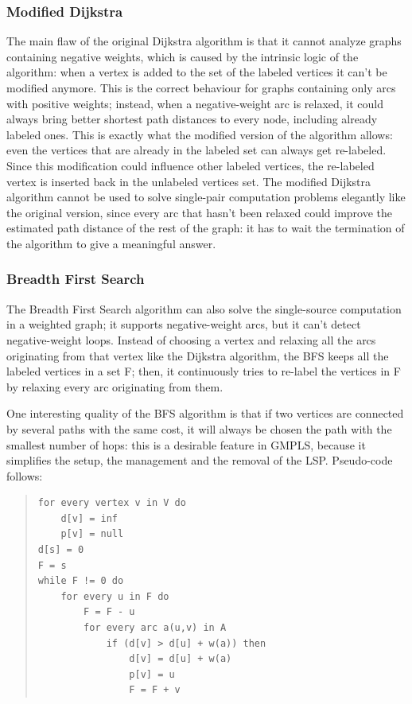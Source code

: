 \documentclass[10pt,a4paper]{report}
\begin{document}
\subsubsection{Modified Dijkstra}

The main flaw of the original Dijkstra algorithm is that it cannot
analyze graphs containing negative weights, which is caused by the
intrinsic logic of the algorithm: when a vertex is added to the set of
the labeled vertices it can't be modified anymore. This is the correct
behaviour for graphs containing only arcs with positive weights;
instead, when a negative-weight arc is relaxed, it could always bring
better shortest path distances to every node, including already
labeled ones. This is exactly what the modified version of the
algorithm allows: even the vertices that are already in the labeled
set can always get re-labeled. Since this modification could influence
other labeled vertices, the re-labeled vertex is inserted back in the
unlabeled vertices set. The modified Dijkstra algorithm cannot be used
to solve single-pair computation problems elegantly like the original
version, since every arc that hasn't been relaxed could improve the
estimated path distance of the rest of the graph: it has to wait the
termination of the algorithm to give a meaningful answer.

\subsubsection{Breadth First Search}

The Breadth First Search algorithm can also solve the single-source
computation in a weighted graph; it supports negative-weight arcs, but
it can't detect negative-weight loops. Instead of choosing a vertex
and relaxing all the arcs originating from that vertex like the
Dijkstra algorithm, the BFS keeps all the labeled vertices in a set F;
then, it continuously tries to re-label the vertices in F by relaxing
every arc originating from them.

One interesting quality of the BFS algorithm is that if two vertices
are connected by several paths with the same cost, it will always be
chosen the path with the smallest number of hops: this is a desirable
feature in GMPLS, because it simplifies the setup, the management and
the removal of the LSP\@. Pseudo-code follows:

\begin{quote}
\begin{lstlisting}
for every vertex v in V do
    d[v] = inf
    p[v] = null
d[s] = 0
F = s
while F != 0 do
    for every u in F do
        F = F - u
        for every arc a(u,v) in A
            if (d[v] > d[u] + w(a)) then
                d[v] = d[u] + w(a)
                p[v] = u
                F = F + v
\end{lstlisting}
\end{quote}
\end{document}
